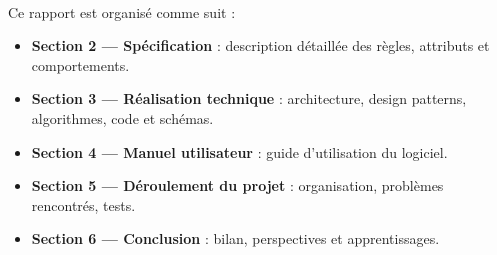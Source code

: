 \paragraph{} Ce rapport est organisé comme suit :
\begin{itemize}
    \item \textbf{Section 2 --- Spécification} : description détaillée des règles, attributs et comportements.
    \item \textbf{Section 3 --- Réalisation technique} : architecture, design patterns, algorithmes, code et schémas.
    \item \textbf{Section 4 --- Manuel utilisateur} : guide d'utilisation du logiciel.
    \item \textbf{Section 5 --- Déroulement du projet} : organisation, problèmes rencontrés, tests.
    \item \textbf{Section 6 --- Conclusion} : bilan, perspectives et apprentissages.
\end{itemize}
